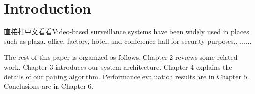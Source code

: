 \chapter{Introduction}
\label{ch:intro}
直接打中文看看Video-based surveillance systems have been widely used in places such as plaza, office, factory, hotel, and conference hall for security purposes\cite{collins2000system},\cite{wang2013intelligent}. ......

The rest of this paper is organized as follows. Chapter 2 reviews some related work. Chapter 3 introduces our system architecture. Chapter 4 explains the details of our pairing algorithm. Performance evaluation results are in Chapter 5. Conclusions are in Chapter 6.
